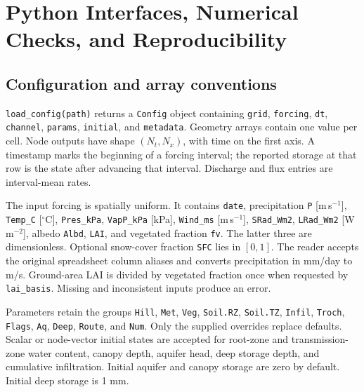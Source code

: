 \section{Python Interfaces, Numerical Checks, and Reproducibility}
\label{sec:python_reference}

\subsection{Configuration and array conventions}

\texttt{load\_config(path)} returns a \texttt{Config} object containing \texttt{grid}, \texttt{forcing}, \texttt{dt}, \texttt{channel}, \texttt{params}, \texttt{initial}, and \texttt{metadata}. Geometry arrays contain one value per cell. Node outputs have shape $(N_t,N_x)$, with time on the first axis. A timestamp marks the beginning of a forcing interval; the reported storage at that row is the state after advancing that interval. Discharge and flux entries are interval-mean rates.

The input forcing is spatially uniform. It contains \texttt{date}, precipitation \texttt{P} [m\,s$^{-1}$], \texttt{Temp\_C} [$^\circ$C], \texttt{Pres\_kPa}, \texttt{VapP\_kPa} [kPa], \texttt{Wind\_ms} [m\,s$^{-1}$], \texttt{SRad\_Wm2}, \texttt{LRad\_Wm2} [W\,m$^{-2}$], albedo \texttt{Albd}, \texttt{LAI}, and vegetated fraction \texttt{fv}. The latter three are dimensionless. Optional snow-cover fraction \texttt{SFC} lies in $[0,1]$. The reader accepts the original spreadsheet column aliases and converts precipitation in mm/day to m/s. Ground-area LAI is divided by vegetated fraction once when requested by \texttt{lai\_basis}. Missing and inconsistent inputs produce an error.

Parameters retain the groups \texttt{Hill}, \texttt{Met}, \texttt{Veg}, \texttt{Soil.RZ}, \texttt{Soil.TZ}, \texttt{Infil}, \texttt{Troch}, \texttt{Flags}, \texttt{Aq}, \texttt{Deep}, \texttt{Route}, and \texttt{Num}. Only the supplied overrides replace defaults. Scalar or node-vector initial states are accepted for root-zone and transmission-zone water content, canopy depth, aquifer head, deep storage depth, and cumulative infiltration. Initial aquifer and canopy storage are zero by default. Initial deep storage is 1 mm.


